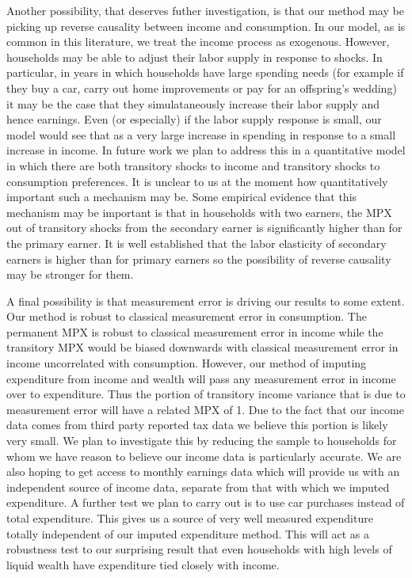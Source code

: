 \documentclass[titlepage]{\econtex}\newcommand{\texname}{IncomeUncertainty}
\begin{document}
Another possibility, that deserves futher investigation, is that our method may be picking up reverse causality between income and consumption. In our model, as is common in this literature, we treat the income process as exogenous. However, households may be able to adjust their labor supply in response to shocks. In particular, in years in which households have large spending needs (for example if they buy a car, carry out home improvements or pay for an offspring's wedding) it may be the case that they simulataneously increase their labor supply and hence earnings. Even (or especially) if the labor supply response is small, our model would see that as a very large increase in spending in response to a small increase in income. In future work we plan to address this in a quantitative model in which there are both transitory shocks to income and transitory shocks to consumption preferences. It is unclear to us at the moment how quantitatively important such a mechanism may be. Some empirical evidence that this mechanism may be important is that in households with two earners, the MPX out of transitory shocks from the secondary earner is significantly higher than for the primary earner. It is well established that the labor elasticity of secondary earners is higher than for primary earners so the possibility of reverse causality may be stronger for them.

A final possibility is that measurement error is driving our results to some extent. Our method is robust to classical measurement error in consumption. The permanent MPX is robust to classical measurement error in income while the transitory MPX would be biased downwards with classical measurement error in income uncorrelated with consumption. However, our method of imputing expenditure from income and wealth will pass any measurement error in income over to expenditure. Thus the portion of transitory income variance that is due to measurement error will have a related MPX of 1. Due to the fact that our income data comes from third party reported tax data we believe this portion is likely very small. We plan to investigate this by reducing the sample to households for whom we have reason to believe our income data is particularly accurate. We are also hoping to get access to monthly earnings data which will provide us with an independent source of income data, separate from that with which we imputed expenditure. A further test we plan to carry out is to use car purchases instead of total expenditure. This gives us a source of very well measured expenditure totally independent of our imputed expenditure method. This will act as a robustness test to our surprising result that even households with high levels of liquid wealth have expenditure tied closely with income.
\end{document}
